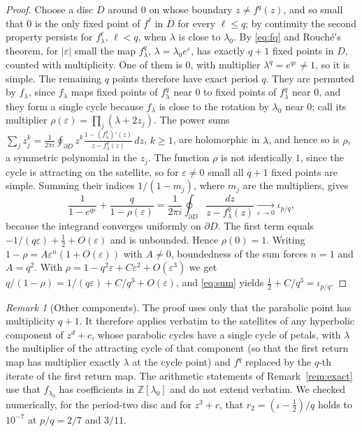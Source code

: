 \documentclass[11pt]{amsart}
\theoremstyle{definition}
\theoremstyle{remark}
\newtheorem{remark}[theorem]{Remark}
\newcommand{\Z}{\mathbb{Z}}
\begin{document}
\begin{proof}
Choose a disc $D$ around $0$ on whose boundary $z\ne f^q(z)$, and so small that $0$ is the only fixed point of $f^\ell$ in $\overline D$ for every $\ell\le q$; by continuity the second property persists for $f_\lambda^\ell$, $\ell<q$, when $\lambda$ is close to $\lambda_0$. By \eqref{eq:fq} and Rouch\'e's theorem, for $|\varepsilon|$ small the map $f_\lambda^q$, $\lambda=\lambda_0e^\varepsilon$, has exactly $q+1$ fixed points in $D$, counted with multiplicity. One of them is $0$, with multiplier $\lambda^q=e^{q\varepsilon}\neq1$, so it is simple. The remaining $q$ points therefore have exact period $q$. They are permuted by $f_\lambda$, since $f_\lambda$ maps fixed points of $f_\lambda^q$ near $0$ to fixed points of $f_\lambda^q$ near $0$, and they form a single cycle because $f_\lambda$ is close to the rotation by $\lambda_0$ near $0$; call its multiplier $\rho(\varepsilon)=\prod_j(\lambda+2z_j)$. The power sums $\sum_jz_j^k=\frac1{2\pi i}\oint_{\partial D}z^k\frac{1-(f_\lambda^q)'(z)}{z-f_\lambda^q(z)}\,dz$, $k\ge1$, are holomorphic in $\lambda$, and hence so is $\rho$, a symmetric polynomial in the $z_j$. The function $\rho$ is not identically $1$, since the cycle is attracting on the satellite, so for $\varepsilon\ne0$ small all $q+1$ fixed points are simple. Summing their indices $1/(1-m_j)$, where $m_j$ are the multipliers, gives
\begin{equation}\label{eq:sum}
\frac1{1-e^{q\varepsilon}}+\frac q{1-\rho(\varepsilon)}=\frac1{2\pi i}\oint_{\partial D}\frac{dz}{z-f_\lambda^q(z)}\xrightarrow[\varepsilon\to0]{}\iota_{p/q},
\end{equation}
because the integrand converges uniformly on $\partial D$. The first term equals $-1/(q\varepsilon)+\frac12+O(\varepsilon)$ and is unbounded. Hence $\rho(0)=1$. Writing $1-\rho=A\varepsilon^n(1+O(\varepsilon))$ with $A\ne0$, boundedness of the sum forces $n=1$ and $A=q^2$. With $\rho=1-q^2\varepsilon+C\varepsilon^2+O(\varepsilon^3)$ we get $q/(1-\rho)=1/(q\varepsilon)+C/q^3+O(\varepsilon)$, and \eqref{eq:sum} yields $\frac12+C/q^3=\iota_{p/q}$.
\end{proof}

\begin{remark}[Other components]\label{rem:general}
The proof uses only that the parabolic point has multiplicity $q+1$. It therefore applies verbatim to the satellites of any hyperbolic component of $z^d+c$, whose parabolic cycles have a single cycle of petals, with $\lambda$ the multiplier of the attracting cycle of that component (so that the first return map has multiplier exactly $\lambda$ at the cycle point) and $f^q$ replaced by the $q$-th iterate of the first return map. The arithmetic statements of Remark~\ref{rem:exact} use that $f_{\lambda_0}$ has coefficients in $\Z[\lambda_0]$ and do not extend verbatim. We checked numerically, for the period-two disc and for $z^3+c$, that $r_2=(\iota-\frac12)/q$ holds to $10^{-7}$ at $p/q=2/7$ and $3/11$.
\end{remark}
\end{document}
